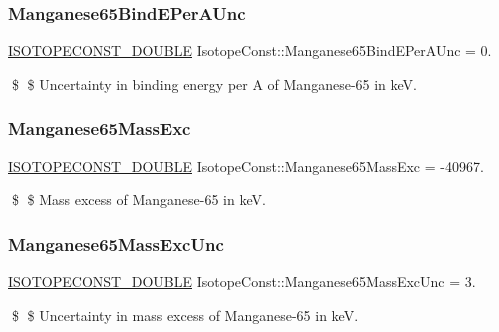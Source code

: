 \subsubsection{\texorpdfstring{Manganese65\+Bind\+E\+Per\+A\+Unc}{Manganese65BindEPerAUnc}}
{\footnotesize\ttfamily \mbox{\hyperlink{group___isotope_const-_macros_ga8f45a7272ce02c0b4c65c44636ed719a}{I\+S\+O\+T\+O\+P\+E\+C\+O\+N\+S\+T\+\_\+\+D\+O\+U\+B\+LE}} Isotope\+Const\+::\+Manganese65\+Bind\+E\+Per\+A\+Unc = 0.}

\$ \$ Uncertainty in binding energy per A of Manganese-\/65 in keV. \mbox{\label{group___isotope_const-_manganese-_mn65_gad3a8be872dae0496e8b66706911ea179}} 
\subsubsection{\texorpdfstring{Manganese65\+Mass\+Exc}{Manganese65MassExc}}
{\footnotesize\ttfamily \mbox{\hyperlink{group___isotope_const-_macros_ga8f45a7272ce02c0b4c65c44636ed719a}{I\+S\+O\+T\+O\+P\+E\+C\+O\+N\+S\+T\+\_\+\+D\+O\+U\+B\+LE}} Isotope\+Const\+::\+Manganese65\+Mass\+Exc = -\/40967.}

\$ \$ Mass excess of Manganese-\/65 in keV. \mbox{\label{group___isotope_const-_manganese-_mn65_ga5963f55c23ece0f044e021bc37edea98}} 
\subsubsection{\texorpdfstring{Manganese65\+Mass\+Exc\+Unc}{Manganese65MassExcUnc}}
{\footnotesize\ttfamily \mbox{\hyperlink{group___isotope_const-_macros_ga8f45a7272ce02c0b4c65c44636ed719a}{I\+S\+O\+T\+O\+P\+E\+C\+O\+N\+S\+T\+\_\+\+D\+O\+U\+B\+LE}} Isotope\+Const\+::\+Manganese65\+Mass\+Exc\+Unc = 3.}

\$ \$ Uncertainty in mass excess of Manganese-\/65 in keV. \mbox{\label{group___isotope_const-_manganese-_mn65_ga1a5b5ff3040818a7e969b45ac431f825}} 
